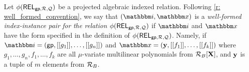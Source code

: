 \documentclass[11pt,letterpaper,usenames,dvipsnames]{article}
\begin{document}
    \begin{definition}\label{d: valid_index_instance_pair}
        Let $\phi(\mathsf{REL}_{\mathsf{gp},\mathcal{R}, \mathcal{Q}})$ be a projected algebraic indexed relation. Following \cref{r: well_formed_convention}, we say that $(\idx,\inp)$ is a \emph{well-formed index-instance pair for the relation $\phi(\mathsf{REL}_{\mathsf{gp},\mathcal{R}, \mathcal{Q}})$} if $\idx$ and $\inp$ have the form specified in the definition of $\phi(\mathsf{REL}_{\mathsf{gp},\mathcal{R}, \mathcal{Q}})$. Namely, if $\idx=(\gparams,\oracle{g_1},\ldots, \oracle{g_n})$ and $\inp= (\yy, \oracle{f_1},\ldots, \oracle{f_k})$  where $g_1, \ldots, g_n, f_1,\ldots, f_k$ are all $\mu$-variate multilinear polynomials from $\mathcal{R}_B[\mathbf{X}]$, and $\mathbf{y}$ is a tuple of $m$ elements from $\mathcal{R}_B$.
    \end{definition}
\end{document}
